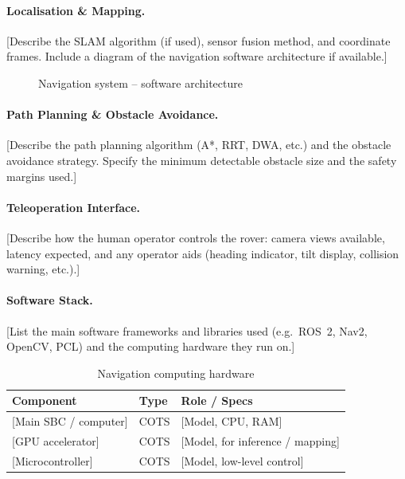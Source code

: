 \paragraph{Localisation \& Mapping.}
[Describe the SLAM algorithm (if used), sensor fusion method, and coordinate
frames. Include a diagram of the navigation software architecture if available.]

\begin{figure}[H]
    \centering
    \caption{Navigation system -- software architecture}
    \label{fig:nav_architecture}
\end{figure}

\paragraph{Path Planning \& Obstacle Avoidance.}
[Describe the path planning algorithm (A*, RRT, DWA, etc.) and the obstacle
avoidance strategy. Specify the minimum detectable obstacle size and the
safety margins used.]

\paragraph{Teleoperation Interface.}
[Describe how the human operator controls the rover: camera views available,
latency expected, and any operator aids (heading indicator, tilt display,
collision warning, etc.).]

\paragraph{Software Stack.}
[List the main software frameworks and libraries used (e.g.\ ROS~2, Nav2,
OpenCV, PCL) and the computing hardware they run on.]

\begin{table}[H]
    \centering
    \caption{Navigation computing hardware}
    \label{tab:nav_hardware}
    \begin{tabular}{L{4cm} L{2cm} L{6cm}}
        \toprule
        \textbf{Component}        & \textbf{Type} & \textbf{Role / Specs} \\
        \midrule
        {[Main SBC / computer]}     & COTS & [Model, CPU, RAM] \\
        {[GPU accelerator]}         & COTS & [Model, for inference / mapping] \\
        {[Microcontroller]}         & COTS & [Model, low-level control] \\
        \bottomrule
    \end{tabular}
\end{table}

